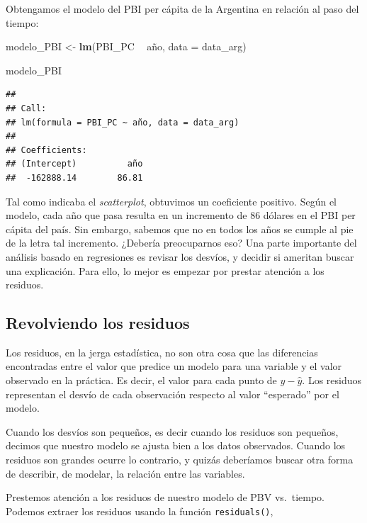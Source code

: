 \documentclass[]{book}
\newenvironment{Shaded}{\begin{snugshade}}{\end{snugshade}}
\newcommand{\KeywordTok}[1]{\textcolor[rgb]{0.13,0.29,0.53}{\textbf{#1}}}
\newcommand{\DataTypeTok}[1]{\textcolor[rgb]{0.13,0.29,0.53}{#1}}
\newcommand{\StringTok}[1]{\textcolor[rgb]{0.31,0.60,0.02}{#1}}
\newcommand{\OperatorTok}[1]{\textcolor[rgb]{0.81,0.36,0.00}{\textbf{#1}}}
\newcommand{\NormalTok}[1]{#1}
\begin{document}
Obtengamos el modelo del PBI per cápita de la Argentina en relación al
paso del tiempo:

\begin{Shaded}
\begin{Highlighting}[]
\NormalTok{modelo_PBI <-}\StringTok{ }\KeywordTok{lm}\NormalTok{(PBI_PC }\OperatorTok{~}\StringTok{ }\NormalTok{año, }\DataTypeTok{data =}\NormalTok{ data_arg)}

\NormalTok{modelo_PBI}
\end{Highlighting}
\end{Shaded}

\begin{verbatim}
## 
## Call:
## lm(formula = PBI_PC ~ año, data = data_arg)
## 
## Coefficients:
## (Intercept)          año  
##  -162888.14        86.81
\end{verbatim}

Tal como indicaba el \emph{scatterplot}, obtuvimos un coeficiente
positivo. Según el modelo, cada año que pasa resulta en un incremento de
86 dólares en el PBI per cápita del país. Sin embargo, sabemos que no en
todos los años se cumple al pie de la letra tal incremento. ¿Debería
preocuparnos eso? Una parte importante del análisis basado en
regresiones es revisar los desvíos, y decidir si ameritan buscar una
explicación. Para ello, lo mejor es empezar por prestar atención a los
residuos.

\subsection{Revolviendo los residuos}\label{revolviendo-los-residuos}

Los residuos, en la jerga estadística, no son otra cosa que las
diferencias encontradas entre el valor que predice un modelo para una
variable y el valor observado en la práctica. Es decir, el valor para
cada punto de \(y - \widehat{y}\). Los residuos representan el desvío de
cada observación respecto al valor ``esperado'' por el modelo.

Cuando los desvíos son pequeños, es decir cuando los residuos son
pequeños, decimos que nuestro modelo se ajusta bien a los datos
observados. Cuando los residuos son grandes ocurre lo contrario, y
quizás deberíamos buscar otra forma de describir, de modelar, la
relación entre las variables.

Prestemos atención a los residuos de nuestro modelo de PBV vs.~tiempo.
Podemos extraer los residuos usando la función \texttt{residuals()},
\end{document}
